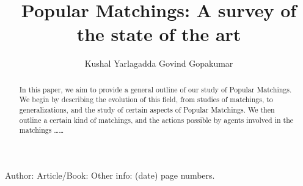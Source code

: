 \documentclass{llncs}
\begin{document}
\title{Popular Matchings: A survey of the state of the art}



\author{Kushal Yarlagadda  Govind Gopakumar}







\maketitle

\begin{abstract}
In this paper, we aim to provide a general outline of our study of Popular Matchings. We begin by describing the evolution of this field, from studies of matchings, to generalizations, and the study of certain aspects of Popular Matchings. We then outline a certain kind of matchings, and the actions possible by agents involved in the matchings \ldots\ldots
\end{abstract}



%
%

\begin{thebibliography}{1}
Author:
Article/Book:
Other info: (date) page numbers.
\end{thebibliography}
\end{document}
